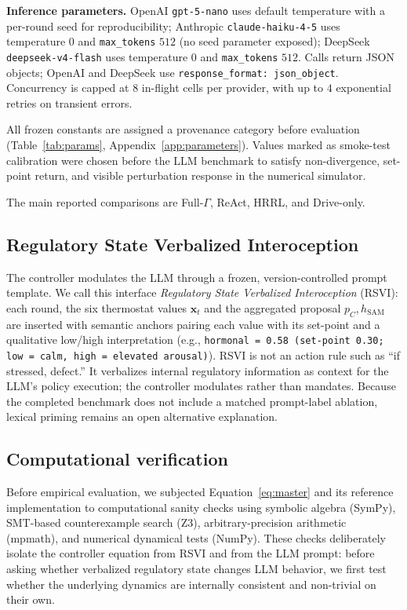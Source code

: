 \documentclass{article}
\begin{document}
\textbf{Inference parameters.} OpenAI \texttt{gpt-5-nano} uses default temperature with a per-round seed for reproducibility; Anthropic \texttt{claude-haiku-4-5} uses temperature $0$ and \texttt{max\_tokens} $512$ (no seed parameter exposed); DeepSeek \texttt{deepseek-v4-flash} uses temperature $0$ and \texttt{max\_tokens} $512$. Calls return JSON objects; OpenAI and DeepSeek use \texttt{response\_format: json\_object}. Concurrency is capped at $8$ in-flight cells per provider, with up to $4$ exponential retries on transient errors.

All frozen constants are assigned a provenance category before evaluation (Table~\ref{tab:params}, Appendix~\ref{app:parameters}). Values marked as smoke-test calibration were chosen before the LLM benchmark to satisfy non-divergence, set-point return, and visible perturbation response in the numerical simulator.

The main reported comparisons are Full-$\Gamma$, ReAct, HRRL, and Drive-only.

\subsection{Regulatory State Verbalized Interoception}\label{sec:prompt-protocol}

The controller modulates the LLM through a frozen, version-controlled prompt template. We call this interface \textit{Regulatory State Verbalized Interoception} (RSVI): each round, the six thermostat values $\mathbf{x}_t$ and the aggregated proposal $p_C, h_{\mathrm{SAM}}$ are inserted with semantic anchors pairing each value with its set-point and a qualitative low/high interpretation (e.g., \texttt{hormonal = 0.58 (set-point 0.30; low = calm, high = elevated arousal)}). RSVI is not an action rule such as ``if stressed, defect.'' It verbalizes internal regulatory information as context for the LLM's policy execution; the controller modulates rather than mandates. Because the completed benchmark does not include a matched prompt-label ablation, lexical priming remains an open alternative explanation.

\subsection{Computational verification}

Before empirical evaluation, we subjected Equation~\eqref{eq:master} and its reference implementation to computational sanity checks using symbolic algebra (SymPy), SMT-based counterexample search (Z3), arbitrary-precision arithmetic (mpmath), and numerical dynamical tests (NumPy). These checks deliberately isolate the controller equation from RSVI and from the LLM prompt: before asking whether verbalized regulatory state changes LLM behavior, we first test whether the underlying dynamics are internally consistent and non-trivial on their own.
\end{document}
